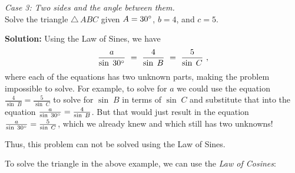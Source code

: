 \begin{exmp}\label{exmp:case3sine}
\noindent \emph{Case 3: Two sides and the angle between them.}\\Solve the triangle $\triangle\,ABC$ given
 $A = 30^\circ$, $b = 4$, and $c = 5$.\vspace{1mm}
 \par\noindent\textbf{Solution:} Using the Law of Sines, we have
 \begin{displaymath}
  \frac{a}{\sin\;30^\circ} ~=~ \frac{4}{\sin\;B} ~=~ \frac{5}{\sin\;C} ~,
 \end{displaymath}
 where each of the equations has two unknown parts, making the problem impossible
 to solve. For example, to solve for $a$ we could
 use the equation $\frac{4}{\sin\;B} = \frac{5}{\sin\;C}$ to solve for $\sin\;B$ in terms of
 $\sin\;C$ and
 substitute that into the equation $\frac{a}{\sin\;30^\circ} = \frac{4}{\sin\;B}$. But that would
 just result in the equation $\frac{a}{\sin\;30^\circ} = \frac{5}{\sin\;C}$, which we already knew
 and which still has two unknowns!\vspace{1mm}
 \par\noindent Thus, this problem can not be solved using the Law of Sines.
\end{exmp}\vspace{-2mm}
\divider
\vspace{2mm}

To solve the triangle in the above example, we can use the \emph{Law of Cosines}:


